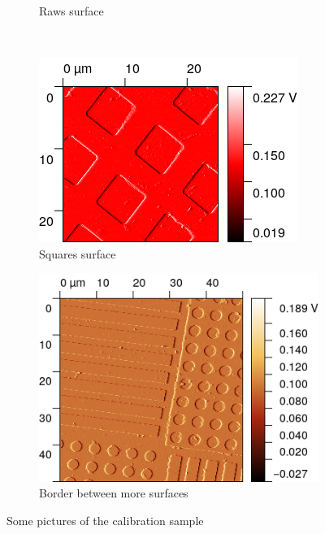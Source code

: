 \documentclass[11pt,a4paper]{article}
\begin{document}
\begin{figure}[H]
\begin{subfigure}[b]{0.45\textwidth}
\caption{Raws surface}
\label{fig:sm_raws}
\end{subfigure}\\\vspace{.2cm}
\begin{subfigure}[b]{0.45\textwidth}
\includegraphics[width=\textwidth]{sm_squares}
\caption{Squares surface}
\label{fig:sm_squares}
\end{subfigure}
\begin{subfigure}[b]{0.45\textwidth}
\includegraphics[width=\textwidth]{sm_border}
\caption{Border between more surfaces}
\label{fig:sm_border}
\end{subfigure}
\caption{Some pictures of the calibration sample}
\end{figure}
\end{document}
